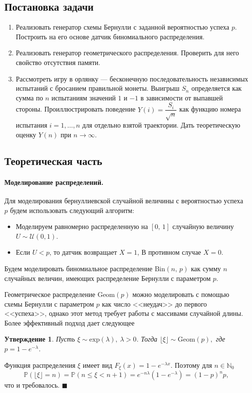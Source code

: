 \documentclass[16pt]{article}
\newtheorem{St}{Утверждение}
\newenvironment{Proof}{\par\noindent{\bf Доказательство.}}{\hfill$\scriptstyle\blacksquare$}
\newcommand{\Prb}{\mathbb{P}}
\begin{document}
\subsection{Постановка задачи}
\begin{enumerate}
	\item  Реализовать генератор схемы Бернулли с заданной вероятностью успеха $p$. Построить на его основе датчик биномиального распределения.
	\item Реализовать генератор геометрического распределения. Проверить для него свойство отсутствия памяти.
	\item Рассмотреть игру в орлянку --- бесконечную последовательность независимых испытаний с бросанием правильной монеты. Выигрыш $S_n$ определяется как сумма по $n$ испытаниям значений $1$ и $-1$ в зависимости от выпавшей стороны. Проиллюстрировать поведение $Y(i) = \dfrac{S_i}{\sqrt{n}}$ как функцию номера испытания $i = 1, \ldots, n$ для отдельно взятой траектории. Дать теоретическую оценку $Y(n)$ при $n \to \infty$.
\end{enumerate}

\subsection{Теоретическая часть}
\paragraph{Моделирование распределений.}
Для моделирования бернуллиевской случайной величины с вероятностью успеха $p$ будем использовать следующий алгоритм:
\begin{itemize}
	\item Моделируем равномерно распределенную на $[0,\, 1]$ случайную величину $U \sim \mathcal{U}(0, 1)$.
	\item Если $U < p$, то датчик возвращает $X = 1$, В противном случае $X = 0$.
\end{itemize}

Будем моделировать биномиальное распределение $\mathrm{Bin}(n,\,p)$ как сумму $n$ случайных величин, имеющих распределение Бернулли с параметром $p$.

Геометрическое распределение $\mathrm{Geom}(p)$ можно моделировать с помощью схемы Бернулли с параметром $p$ как число <<неудач>> до первого <<успеха>>, однако этот метод требует работы с массивами случайной длины. Более эффективный подход дает следующее
\begin{St}
Пусть $\xi \sim \mathrm{exp}(\lambda), \ \lambda > 0$. Тогда $\lfloor \xi \rfloor \sim \mathrm{Geom}(p),$ где $p = 1 - e^{-\lambda}$.
\end{St}
\begin{Proof}

Функция распределения $\xi$ имеет вид
$F_\xi(x) = 1 - e^{-\lambda x}$. Поэтому для $n \in \mathbb{N}_0$
$$\Prb(\lfloor \xi \rfloor = n) = \Prb(n \leq \xi < n + 1) = e^{-n\lambda}(1 - e^{-\lambda}) = (1 - p)^np,$$
что и требовалось.
\end{Proof}
\end{document}
